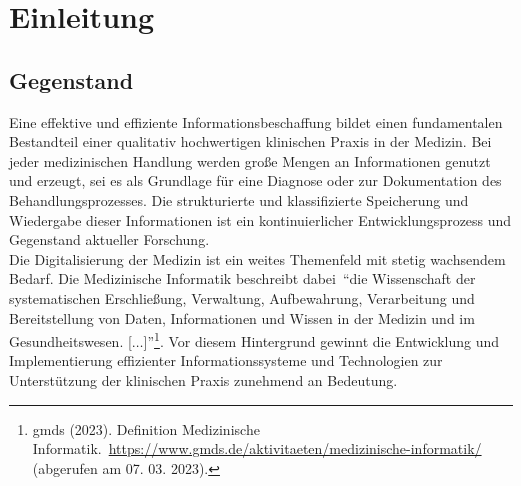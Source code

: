 \chapter{Einleitung}\label{ch:introduction}
\section{Gegenstand}\label{sec:gegenstand}
Eine effektive und effiziente Informationsbeschaffung bildet einen fundamentalen Bestandteil einer qualitativ hochwertigen klinischen Praxis in der Medizin.
Bei jeder medizinischen Handlung werden große Mengen an Informationen genutzt und erzeugt, sei es als Grundlage für eine Diagnose oder zur Dokumentation des Behandlungsprozesses.
Die strukturierte und klassifizierte Speicherung und Wiedergabe dieser Informationen ist ein kontinuierlicher Entwicklungsprozess und Gegenstand aktueller Forschung.\\

Die Digitalisierung der Medizin ist ein weites Themenfeld mit stetig wachsendem Bedarf.
Die Medizinische Informatik beschreibt dabei~\enquote{die Wissenschaft der systematischen Erschließung, Verwaltung, Aufbewahrung, Verarbeitung und Bereitstellung von Daten, Informationen und Wissen in der Medizin und im Gesundheitswesen. [$\dots$]}\footnote{\raggedright{}\ac{gmds} (2023). Definition Medizinische Informatik.\ \url{https://www.gmds.de/aktivitaeten/medizinische-informatik/} (abgerufen am 07. 03. 2023).}.
Vor diesem Hintergrund gewinnt die Entwicklung und Implementierung effizienter Informationssysteme und Technologien zur Unterstützung der klinischen Praxis zunehmend an Bedeutung.\\

